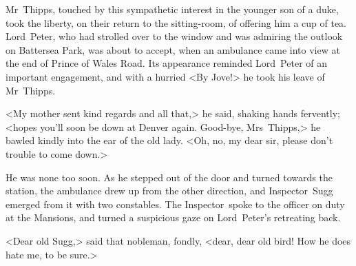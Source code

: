 Mr~Thipps, touched by this sympathetic interest in the younger son of a duke, took the liberty, on their return to the sitting-room, of offering him a cup of tea. Lord~Peter, who had strolled over to the window and was admiring the outlook on Battersea Park, was about to accept, when an ambulance came into view at the end of Prince of Wales Road. Its appearance reminded Lord~Peter of an important engagement, and with a hurried <By Jove!> he took his leave of Mr~Thipps.

<My mother sent kind regards and all that,> he said, shaking hands fervently; <hopes you'll soon be down at Denver again. Good-bye, Mrs~Thipps,> he bawled kindly into the ear of the old lady. <Oh, no, my dear sir, please don't trouble to come down.>

He was none too soon. As he stepped out of the door and turned towards the station, the ambulance drew up from the other direction, and Inspector~Sugg emerged from it with two constables. The Inspector~spoke to the officer on duty at the Mansions, and turned a suspicious gaze on Lord~Peter's retreating back.

<Dear old Sugg,> said that nobleman, fondly, <dear, dear old bird! How he does hate me, to be sure.>